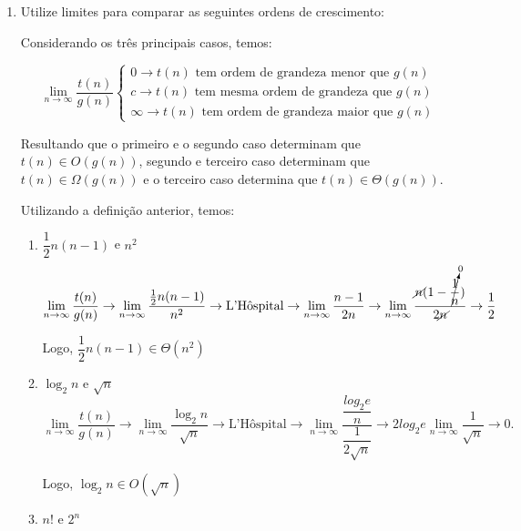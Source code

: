 \documentclass[12pt,a4paper]{article}
\begin{document}
\begin{enumerate}
	
	\item Utilize limites para comparar as seguintes ordens de crescimento:
	
	Considerando os três principais casos, temos:
	
	\begin{displaymath}
		\lim_{n \rightarrow \infty} \dfrac{t(n)}{g(n)}
		\begin{cases}
			0 \rightarrow t(n) \text{ tem ordem de grandeza menor que } g(n)\\
			c \rightarrow t(n) \text{ tem mesma ordem de grandeza que } g(n)\\
			\infty \rightarrow t(n) \text{ tem ordem de grandeza maior que } g(n)
		\end{cases}
	\end{displaymath}

	Resultando que o primeiro e o segundo caso determinam que $t(n) \in O(g(n))$, segundo e terceiro caso determinam que $t(n) \in \Omega(g(n))$ e o terceiro caso determina que $t(n) \in \Theta(g(n))$. 
	
	Utilizando a definição anterior, temos:		
	
	\begin{enumerate}
		\item $\dfrac{1}{2}n(n-1)$ e $n^2$
		\begin{displaymath}
			\lim_{n \rightarrow \infty} \dfrac{t(n)}{g(n)} \rightarrow
			\lim_{n \rightarrow \infty} \dfrac{\frac{1}{2}n(n-1)}{n^2} \rightarrow \text{L'Hôspital} \rightarrow \lim_{n \rightarrow \infty} \dfrac{n-1}{2n} \rightarrow  \lim_{n \rightarrow \infty} \dfrac{\cancel{n}(1-\cancelto{0}{\dfrac{1}{n}})}{2\cancel{n}} \rightarrow \dfrac{1}{2}
		\end{displaymath}
		
		Logo,  $\dfrac{1}{2}n(n-1) \in \Theta(n^2)$	
		
		\item $\log_2 n$ e $\sqrt{n}$		
		\begin{displaymath}
			\lim_{n \rightarrow \infty} \dfrac{t(n)}{g(n)} \rightarrow
			\lim_{n \rightarrow \infty} \dfrac{\log_2 n}{\sqrt{n}} \rightarrow \text{L'Hôspital} \rightarrow \lim_{n \rightarrow \infty} \dfrac{\dfrac{log_2 e}{n}}{\dfrac{1}{2\sqrt{n}}} \rightarrow 2log_2 e \lim_{n \rightarrow \infty} \dfrac{1}{\sqrt{n}} \rightarrow 0.
		\end{displaymath}
	
		Logo,  $\log_2 n \in O(\sqrt{n})$	
		
		\item $n!$ e $2^n$
		

\end{enumerate}
\end{enumerate}
\end{document}
